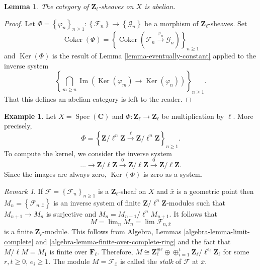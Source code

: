 \documentclass{stacks-project}
\theoremstyle{plain}
\newtheorem{lemma}[subsection]{Lemma}
\theoremstyle{definition}
\newtheorem{example}[subsection]{Example}
\theoremstyle{remark}
\newtheorem{remark}[subsection]{Remark}
\numberwithin{equation}{subsection}
\def\lim{\mathop{\mathrm{lim}}\nolimits}
\def\Spec{\mathop{\mathrm{Spec}}}
\def\Ker{\mathop{\mathrm{Ker}}}
\def\Im{\mathop{\mathrm{Im}}}
\def\Coker{\mathop{\mathrm{Coker}}}
\begin{document}
\begin{lemma}
\label{lemma-l-adic-abelian}
The category of $\mathbf{Z}_\ell$-sheaves on $X$ is abelian.
\end{lemma}

\begin{proof}
Let
$\Phi = \left\{\varphi_n\right\}_{n\geq 1} :
\left\{\mathcal{F}_n\right\}
\to
\left\{\mathcal{G}_n\right\}$
be a morphism of $\mathbf{Z}_\ell$-sheaves. Set
$$
\Coker(\Phi) =
\left\{
\Coker\left(\mathcal{F}_n \xrightarrow{\varphi_n} \mathcal{G}_n\right)
\right\}_{n\geq 1}
$$
and $\Ker(\Phi)$ is the result of
Lemma \ref{lemma-eventually-constant}
applied to the inverse system
$$
\left\{
\bigcap_{m\geq n}
\Im\left(\Ker(\varphi_m) \to \Ker(\varphi_n)\right)
\right\}_{n \geq 1}.
$$
That this defines an abelian category is left to the reader.
\end{proof}

\begin{example}
\label{example-kernel}
Let $X=\Spec(\mathbf{C})$ and $\Phi : \mathbf{Z}_\ell\to \mathbf{Z}_\ell$
be multiplication by $\ell$. More precisely,
$$
\Phi = \left\{ \mathbf{Z}/\ell^n\mathbf{Z} \xrightarrow{\ell}
\mathbf{Z}/\ell^n\mathbf{Z}\right\}_{n \geq 1}.
$$
To compute the kernel, we consider the inverse system
$$
\ldots\to \mathbf{Z}/\ell\mathbf{Z}\xrightarrow{0}
\mathbf{Z}/\ell\mathbf{Z}\xrightarrow{0}\mathbf{Z}/\ell\mathbf{Z}.
$$
Since the images are always zero, $\Ker(\Phi)$ is zero as a system.
\end{example}

\begin{remark}
\label{remark-stalk-l-adic-sheaf}
If $\mathcal{F} = \left\{\mathcal{F}_n\right\}_{n\geq 1}$ is a
$\mathbf{Z}_\ell$-sheaf on $X$ and $\bar x$ is a geometric point then
$M_n = \left\{\mathcal{F}_{n, \bar x}\right\}$ is an inverse system of finite
$\mathbf{Z}/\ell^n\mathbf{Z}$-modules such that $M_{n+1}\to M_n$ is surjective
and $M_n = M_{n+1}/\ell^n M_{n+1}$. It follows that
$$
M = \lim_n M_n = \lim \mathcal{F}_{n, \bar x}
$$
is a finite $\mathbf{Z}_\ell$-module. This follows from
Algebra, Lemmas \ref{algebra-lemma-limit-complete} and
\ref{algebra-lemma-finite-over-complete-ring} and the fact that
$M/\ell M = M_1$ is finite over $\mathbf{F}_\ell$.
Therefore, $M\cong \mathbf{Z}_\ell^{\oplus r} \oplus \oplus_{i = 1}^t
\mathbf{Z}_\ell/\ell^{e_i}\mathbf{Z}_\ell$ for some $r, t\geq 0$, $e_i\geq 1$.
The module $M = \mathcal{F}_{\bar x}$ is called the {\it stalk} of
$\mathcal{F}$ at $\bar x$.
\end{remark}
\end{document}
